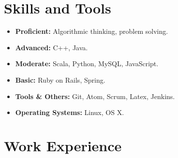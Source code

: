 \documentclass[a4paper,11pt]{article} %
\begin{document}

\section{Skills and Tools}
\begin{itemize}
 \item \textbf{Proficient:} Algorithmic thinking, problem solving.
 \item \textbf{Advanced:} C++, Java.
 \item \textbf{Moderate:} Scala, Python, MySQL, JavaScript.
 \item \textbf{Basic:} Ruby on Rails, Spring.
 \item \textbf{Tools \& Others:} Git, Atom, Scrum, Latex, Jenkins.
 \item \textbf{Operating Systems:} Linux, OS X.
\end{itemize}



\section{Work Experience}
\end{document}
